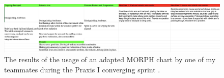 \documentclass{report}
\begin{document}
\begin{figure}[h]
    \centering
    \includegraphics[width=\textwidth]{images/morphresults.png}
    \hfill
    \caption{The results of the usage of an adapted MORPH chart by one of my teammates during the Praxis I converging sprint \cite{designcrit}.}
\end{figure}

\pagebreak




\end{document}
